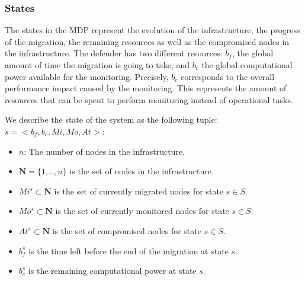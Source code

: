 \subsubsection{States}
\label{sec:stateset}
The states in the MDP represent the evolution of the infrastructure, \ie the progress of the migration, the remaining resources as well as the compromised nodes in the infrastructure.
The defender has two different resources: $b_f$, the global amount of time the migration is going to take, and $b_c$ the global computational power available for the monitoring.
Precisely, $b_c$ corresponds to the overall performance impact caused by the monitoring. %
This represents the amount of resources that can be spent to perform monitoring instead of operational tasks.


We describe the state of the system as the following tuple: $s=<b_f,b_c,Mi,Mo,At>$:
\begin{itemize}
    \item $n$: The number of nodes in the infrastructure.
    \item $\textbf{N} = \{1,..,n\}$ is the set of nodes in the infrastructure.
    \item $Mi^s \subset \textbf{N} $ is the set of currently migrated nodes for state $s\in S$.
    \item $Mo^s \subset \textbf{N}$ is the set of currently monitored nodes for state $s\in S$.
    \item $At^s \subset \textbf{N}$ is the set of compromised nodes for state $s \in S$.
    \item $b_f^s$ is the time left before the end of the migration at state $s$.
    \item $b_c^s$ is the remaining computational power at state $s$.
\end{itemize}


